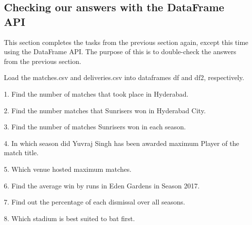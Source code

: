 \documentclass{article}
\begin{document}
\subsection*{Checking our answers with the DataFrame API}
This section completes the tasks from the previous section again, except this time 
using the DataFrame API. The purpose of this is to double-check the answers from the 
previous section.

Load the matches.csv and deliveries.csv into dataframes df and df2, respectively.


1. Find the number of matches that took place in Hyderabad.


2. Find the number matches that Sunrisers won in Hyderabad City.

\newpage

3. Find the number of matches Sunrisers won in each season.


4. In which season did Yuvraj Singh has been awarded maximum Player of the match title.


5. Which venue hosted maximum matches.

\newpage

6. Find the average win by runs in Eden Gardens in Season 2017.


7. Find out the percentage of each dismissal over all seasons.


8. Which stadium is best suited to bat first.


\end{document}
